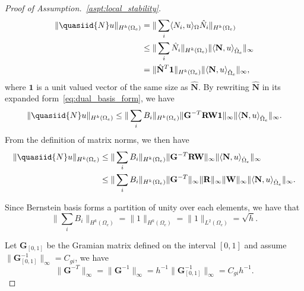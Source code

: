 \begin{proof}[Proof of Assumption.~\ref{aspt:local_stability}]
	\begin{align}
		\begin{split}
			\| \quasiid{N}u \|_{H^k(\Omega_e)} &= \| \sum_i \langle {N_i,u} \rangle_{\Omega}\hat{N}_i \|_{H^k(\Omega_e)}\\
			&\leq \| \sum_i \hat{N}_i\|_{H^k(\Omega_e)} \| \langle {\mathbf{N},u} \rangle_{\hat{\Omega}_e} \|_\infty\\
			&= \| \hat{\mathbf{N}}^T\mathbf{1} \|_{H^k(\Omega_e)} \| \langle {\mathbf{N},u} \rangle_{\hat{\Omega}_e} \|_\infty,
		\end{split}
	\end{align}
	where $\mathbf{1}$ is a unit valued vector of the same size as $\hat{\mathbf{N}}$. By rewriting $\hat{\mathbf{N}}$ in its expanded form~\eqref{eq:dual_basis_form}, we have
	\begin{equation}
		\| \quasiid{N}u \|_{H^k(\Omega_e)} \leq  \| \sum_i{B_i} \|_{H^k(\Omega_e)} \| \mathbf{G}^{-T}\mathbf{R}\mathbf{W}\mathbf{1} \|_\infty \| \langle {\mathbf{N},u} \rangle_{\hat{\Omega}_e} \|_\infty.
	\end{equation}
	From the definition of matrix norms, we then have
	\begin{equation}
		\begin{split}
			\| \quasiid{N}u \|_{H^k(\Omega_e)} &\leq \| \sum_i{B_i} \|_{H^k(\Omega_e)} \| \mathbf{G}^{-T}\mathbf{R}\mathbf{W}\|_\infty \| \langle {\mathbf{N},u} \rangle_{\hat{\Omega}_e} \|_\infty\\
			&\leq \| \sum_i{B_i} \|_{H^k(\Omega_e)} \| \mathbf{G}^{-T} \|_\infty \| \mathbf{R} \|_\infty \| \mathbf{W} \|_\infty \| \langle {\mathbf{N},u} \rangle_{\hat{\Omega}_e} \|_\infty.
		\end{split}\label{eq:proof_of_assumption3_1}
	\end{equation}

	Since Bernstein basis forms a partition of unity over each elements, we have that
	\begin{equation}
		\| \sum_i{B_i} \|_{H^k(\Omega_e)} = \| 1 \|_{H^k(\Omega_e)} = \| 1 \|_{L^2(\Omega_e)} = \sqrt{h}.\label{eq:proof_of_assumption3_2}
	\end{equation}

	Let $\mathbf{G}_{\left[ 0,1 \right]}$ be the Gramian matrix defined on the interval $\left[ 0,1 \right]$ and assume $\|\mathbf{G}^{-1}_{\left[ 0,1 \right]}\|_\infty = C_{gi}$, we have
	\begin{equation}
		\| \mathbf{G}^{-T} \|_\infty = \| \mathbf{G}^{-1} \|_\infty = h^{-1} \|\mathbf{G}^{-1}_{\left[ 0,1 \right]}\|_\infty = C_{gi}h^{-1}.\label{eq:proof_of_assumption3_3}
	\end{equation}


\end{proof}
